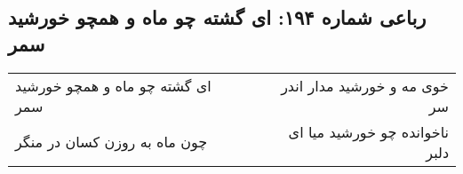 \begin{center}
\section*{رباعی شماره ۱۹۴: ای گشته چو ماه و همچو خورشید سمر}
\label{sec:sh194}
\begin{longtable}{l p{0.5cm} r}
ای گشته چو ماه و همچو خورشید سمر
&&
خوی مه و خورشید مدار اندر سر
\\
چون ماه به روزن کسان در منگر
&&
ناخوانده چو خورشید میا ای دلبر
\\
\end{longtable}
\end{center}
